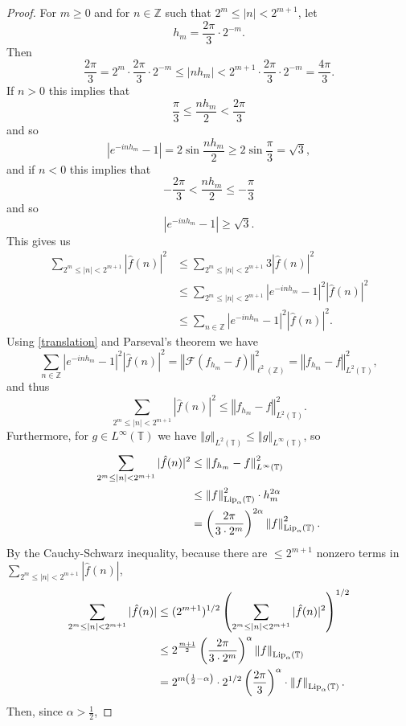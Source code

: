 \documentclass{article}
\newcommand{\Lip}{\ensuremath\mathrm{Lip}}
\newcommand{\norm}[1]{\left\Vert #1 \right\Vert}
\theoremstyle{definition}
\begin{document}
\begin{proof}
For $m \geq 0$ and 
for $n \in \mathbb{Z}$ such that
$2^m \leq |n| < 2^{m+1}$, let 
\[
h_m = \frac{2\pi}{3}\cdot 2^{-m}.
\]
Then
\[
\frac{2\pi}{3} =2^m \cdot  \frac{2\pi}{3}\cdot 2^{-m}   \leq |nh_m| < 2^{m+1} \cdot \frac{2\pi}{3}\cdot 2^{-m} = \frac{4\pi}{3}.
\]
If $n>0$  this implies that
\[
\frac{\pi}{3} \leq \frac{nh_m}{2} < \frac{2\pi}{3} 
\]
and so
\[
|e^{-inh_m}-1| = 2 \sin \frac{nh_m}{2} \geq 2 \sin \frac{\pi}{3} = \sqrt{3},
\]
and if $n<0$ this implies that
\[
-\frac{2\pi}{3} < \frac{nh_m}{2} \leq -\frac{\pi}{3}
\]
and so
\[
|e^{-inh_m}-1| \geq \sqrt{3}.
\]
This gives us
\begin{align*}
\sum_{2^m \leq |n| < 2^{m+1}} |\hat{f}(n)|^2 &\leq \sum_{2^m \leq |n| < 2^{m+1}} 3|\hat{f}(n)|^2\\
&\leq \sum_{2^m \leq |n| < 2^{m+1}}  |e^{-inh_m}-1|^2 |\hat{f}(n)|^2\\
&\leq \sum_{n \in \mathbb{Z}}  |e^{-inh_m}-1|^2 |\hat{f}(n)|^2.
\end{align*}
Using \eqref{translation} and Parseval's theorem we  have
\[
\sum_{n \in \mathbb{Z}}  |e^{-inh_m}-1|^2 |\hat{f}(n)|^2=\norm{\mathscr{F}(f_{h_m}-f)}_{\ell^2(\mathbb{Z})}^2
=\norm{f_{h_m}-f}_{L^2(\mathbb{T})}^2,
\]
and thus
\[
\sum_{2^m \leq |n| < 2^{m+1}} |\hat{f}(n)|^2 \leq \norm{f_{h_m}-f}_{L^2(\mathbb{T})}^2.
\]
Furthermore, for $g \in L^\infty(\mathbb{T})$ we have $\norm{g}_{L^2(\mathbb{T})} \leq \norm{g}_{L^\infty(\mathbb{T})}$, so 
\begin{align*}
\sum_{2^m \leq |n| < 2^{m+1}} |\hat{f}(n)|^2 & \leq \norm{f_{h_m}-f}_{L^\infty(\mathbb{T})}^2\\
&\leq \norm{f}_{\Lip_\alpha(\mathbb{T})}^2 \cdot h_m^{2\alpha}\\
&=\left( \frac{2\pi}{3\cdot 2^m} \right)^{2\alpha} \norm{f}_{\Lip_\alpha(\mathbb{T})}^2.
\end{align*}
By the Cauchy-Schwarz inequality, because there are $\leq 2^{m+1}$ nonzero
terms in $\sum_{2^m \leq |n| < 2^{m+1}} |\hat{f}(n)|$, 
\begin{align*}
\sum_{2^m \leq |n| < 2^{m+1}} |\hat{f}(n)|& \leq (2^{m+1})^{1/2} 
\left( \sum_{2^m \leq |n| < 2^{m+1}} |\hat{f}(n)|^2 \right)^{1/2}\\
&\leq 2^{\frac{m+1}{2}} \left( \frac{2\pi}{3\cdot 2^m} \right)^{\alpha} \norm{f}_{\Lip_\alpha(\mathbb{T})}\\
&=2^{m\left(\frac{1}{2}-\alpha\right)} \cdot 2^{1/2} \left( \frac{2\pi}{3} \right)^\alpha \cdot  \norm{f}_{\Lip_\alpha(\mathbb{T})}.
\end{align*}
Then, since $\alpha>\frac{1}{2}$,

\end{proof}
\end{document}
